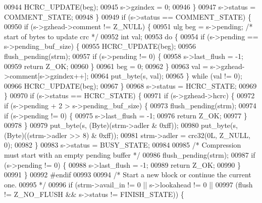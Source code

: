\begin{DoxyCode}
{00944             HCRC\_UPDATE(beg);
00945             s->gzindex = 0;
00946         \}
00947         s->status = COMMENT\_STATE;
00948     \}
00949     \textcolor{keywordflow}{if} (s->status == COMMENT\_STATE) \{
00950         \textcolor{keywordflow}{if} (s->gzhead->comment != Z\_NULL) \{
00951             ulg beg = s->pending;   \textcolor{comment}{/* start of bytes to update crc */}
00952             \textcolor{keywordtype}{int} val;
00953             \textcolor{keywordflow}{do} \{
00954                 \textcolor{keywordflow}{if} (s->pending == s->pending\_buf\_size) \{
00955                     HCRC\_UPDATE(beg);
00956                     flush\_pending(strm);
00957                     \textcolor{keywordflow}{if} (s->pending != 0) \{
00958                         s->last\_flush = -1;
00959                         \textcolor{keywordflow}{return} Z\_OK;
00960                     \}
00961                     beg = 0;
00962                 \}
00963                 val = s->gzhead->comment[s->gzindex++];
00964                 put\_byte(s, val);
00965             \} \textcolor{keywordflow}{while} (val != 0);
00966             HCRC\_UPDATE(beg);
00967         \}
00968         s->status = HCRC\_STATE;
00969     \}
00970     \textcolor{keywordflow}{if} (s->status == HCRC\_STATE) \{
00971         \textcolor{keywordflow}{if} (s->gzhead->hcrc) \{
00972             \textcolor{keywordflow}{if} (s->pending + 2 > s->pending\_buf\_size) \{
00973                 flush\_pending(strm);
00974                 \textcolor{keywordflow}{if} (s->pending != 0) \{
00975                     s->last\_flush = -1;
00976                     \textcolor{keywordflow}{return} Z\_OK;
00977                 \}
00978             \}
00979             put\_byte(s, (Byte)(strm->adler & 0xff));
00980             put\_byte(s, (Byte)((strm->adler >> 8) & 0xff));
00981             strm->adler = crc32(0L, Z\_NULL, 0);
00982         \}
00983         s->status = BUSY\_STATE;
00984 
00985         \textcolor{comment}{/* Compression must start with an empty pending buffer */}
00986         flush\_pending(strm);
00987         \textcolor{keywordflow}{if} (s->pending != 0) \{
00988             s->last\_flush = -1;
00989             \textcolor{keywordflow}{return} Z\_OK;
00990         \}
00991     \}
00992 \textcolor{preprocessor}{#endif}
00993 
00994     \textcolor{comment}{/* Start a new block or continue the current one.}
00995 \textcolor{comment}{     */}
00996     \textcolor{keywordflow}{if} (strm->avail\_in != 0 || s->lookahead != 0 ||
00997         (flush != Z\_NO\_FLUSH && s->status != FINISH\_STATE)) \{
}
\end{DoxyCode}
